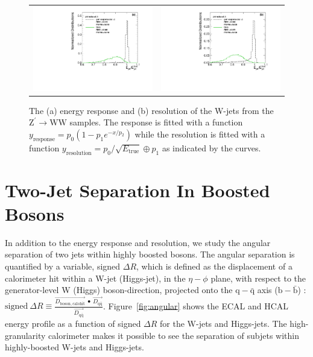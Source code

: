 \documentclass{PoS}
\begin{document}
\begin{figure}
\begin{center}
\begin{tabular}{cc}
\includegraphics[width=.4\textwidth]{figs/ZprimeWW_radius0p4_h_jeratio_gen_response.pdf} &
\includegraphics[width=.4\textwidth]{figs/2HDM_radius0p4_h_jeratio_gen_response.pdf} \\
\end{tabular}
\end{center}
\caption{The (a) energy response and (b) resolution of the W-jets from the 
$\mathrm{Z}^{\prime}\rightarrow \mathrm{WW}$ samples. The response is fitted 
with a function $y_\mathrm{response} = p_0\left(1-p_1 e^{-x/p_2}\right)$ 
while the resolution is fitted with a function 
$y_\mathrm{resolution}=p_0/\sqrt{E_\mathrm{true}}\oplus p_1$ as indicated 
by the curves.}
\label{fig:wjet}
\end{figure}

\section{Two-Jet Separation In Boosted Bosons \label{sec:angular}}
In addition to the energy response and resolution, we study the angular 
separation of two jets within highly boosted bosons. The angular separation 
is quantified by a variable, signed $\Delta R$, which is defined as the 
displacement of a calorimeter hit within a W-jet (Higgs-jet), in the 
$\eta-\phi$ plane, with respect to the generator-level W (Higgs) boson-direction, projected onto the $\mathrm{q}-\bar{\mathrm{q}}$ 
axis ($\mathrm{b}-\bar{\mathrm{b}}$) : \( \mathrm{signed}~\Delta R \equiv 
\frac{\overrightarrow{D_{\mathrm{boson,calohit}}}~\bullet~\overrightarrow{D_{\mathrm{q}\bar{\mathrm{q}}}}}{\overrightarrow{D_{\mathrm{q}\bar{\mathrm{q}}}}}\). 
Figure~\ref{fig:angular} shows the ECAL and HCAL energy profile as a function 
of signed $\Delta R$ for the W-jets and Higgs-jets. The high-granularity 
calorimeter makes it possible to see the separation of subjets within 
highly-boosted W-jets and Higgs-jets.
\end{document}
